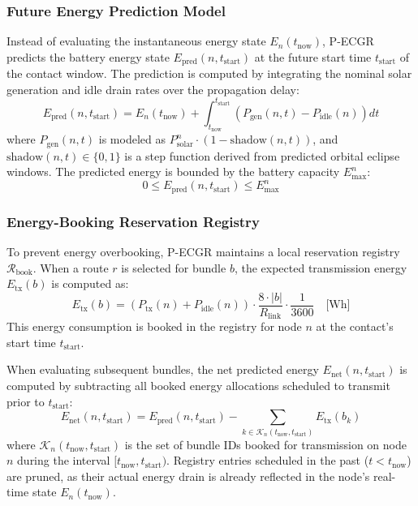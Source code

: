\documentclass[a4paper,fleqn]{cas-dc}
\newcommand{\pecgr}{\textsf{P-ECGR}}
\begin{document}
\subsubsection{Future Energy Prediction Model}
Instead of evaluating the instantaneous energy state $E_n(t_{\text{now}})$, \pecgr{} predicts the battery energy state $E_{\text{pred}}(n, t_{\text{start}})$ at the future start time $t_{\text{start}}$ of the contact window. The prediction is computed by integrating the nominal solar generation and idle drain rates over the propagation delay:
\begin{equation}
    E_{\text{pred}}(n, t_{\text{start}}) = E_n(t_{\text{now}}) + \int_{t_{\text{now}}}^{t_{\text{start}}} \left( P_{\text{gen}}(n, t) - P_{\text{idle}}(n) \right) dt
\end{equation}
where $P_{\text{gen}}(n, t)$ is modeled as $P_{\text{solar}}^n \cdot (1 - \text{shadow}(n, t))$, and $\text{shadow}(n, t) \in \{0, 1\}$ is a step function derived from predicted orbital eclipse windows. The predicted energy is bounded by the battery capacity $E_{\max}^n$:
\begin{equation}
    0 \leq E_{\text{pred}}(n, t_{\text{start}}) \leq E_{\max}^n
\end{equation}

\subsubsection{Energy-Booking Reservation Registry}
To prevent energy overbooking, \pecgr{} maintains a local reservation registry $\mathcal{R}_{\text{book}}$. When a route $r$ is selected for bundle $b$, the expected transmission energy $E_{\text{tx}}(b)$ is computed as:
\begin{equation}
    E_{\text{tx}}(b) = \left( P_{\text{tx}}(n) + P_{\text{idle}}(n) \right) \cdot \frac{8 \cdot |b|}{R_{\text{link}}} \cdot \frac{1}{3600} \quad \text{[Wh]}
\end{equation}
This energy consumption is booked in the registry for node $n$ at the contact's start time $t_{\text{start}}$.

When evaluating subsequent bundles, the net predicted energy $E_{\text{net}}(n, t_{\text{start}})$ is computed by subtracting all booked energy allocations scheduled to transmit prior to $t_{\text{start}}$:
\begin{equation}
    E_{\text{net}}(n, t_{\text{start}}) = E_{\text{pred}}(n, t_{\text{start}}) - \sum_{k \in \mathcal{K}_n(t_{\text{now}}, t_{\text{start}})} E_{\text{tx}}(b_k)
\end{equation}
where $\mathcal{K}_n(t_{\text{now}}, t_{\text{start}})$ is the set of bundle IDs booked for transmission on node $n$ during the interval $[t_{\text{now}}, t_{\text{start}})$. Registry entries scheduled in the past ($t < t_{\text{now}}$) are pruned, as their actual energy drain is already reflected in the node's real-time state $E_n(t_{\text{now}})$.
\end{document}
